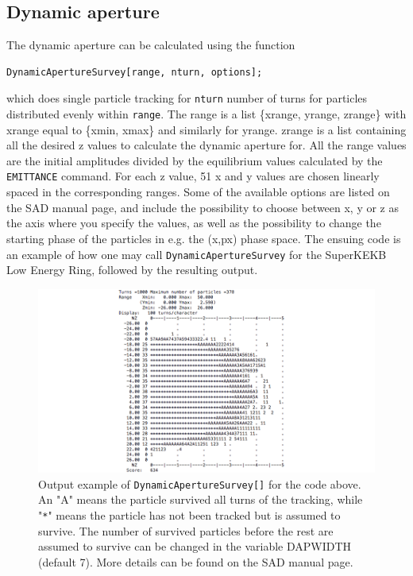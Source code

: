 \documentclass{article}
\begin{document}
\subsection{Dynamic aperture}
The dynamic aperture can be calculated using the function
\begin{lstlisting}
DynamicApertureSurvey[range, nturn, options];
\end{lstlisting}
which does single particle tracking for \texttt{nturn} number of turns for particles distributed evenly within \texttt{range}.
The range is a list \{xrange, yrange, zrange\} with xrange equal to \{xmin, xmax\} and similarly for yrange. zrange is a list containing all the desired z values to calculate the dynamic aperture for. All the range values are the initial amplitudes divided by the equilibrium values calculated by the \texttt{EMITTANCE} command. For each z value, 51 x and y values are chosen linearly spaced in the corresponding ranges. Some of the available options are listed on the SAD manual page, and include the possibility to choose between x, y or z as the axis where you specify the values, as well as the possibility to change the starting phase of the particles in e.g. the (x,px) phase space. The ensuing code is an example of how one may call \texttt{DynamicApertureSurvey} for the SuperKEKB Low Energy Ring, followed by the resulting output.
%

%
\begin{figure}[h]
	\begin{center}
	\includegraphics[width=1\columnwidth]{figures/dynamicApertSurveyOutput.png}
	\end{center}
	\caption{Output example of \texttt{DynamicApertureSurvey[]} for the code above. An "A" means the particle survived all turns of the tracking, while "\texttt{*}" means the particle has not been tracked but is assumed to survive. The number of survived particles before the rest are assumed to survive can be changed in the variable DAPWIDTH (default 7). More details can be found on the SAD manual page.}
	\label{fig:dynamicApertSurveyOutput}
\end{figure}
\end{document}
